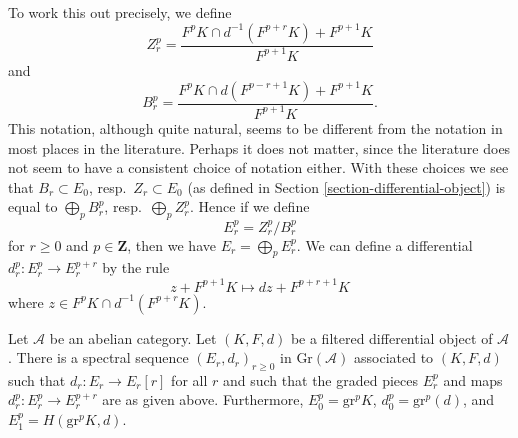 \medskip\noindent
To work this out precisely, we define
$$
Z_r^p =
\frac{F^pK \cap d^{-1}(F^{p + r}K) + F^{p + 1}K}{F^{p + 1}K}
$$
and
$$
B_r^p =
\frac{F^pK \cap d(F^{p - r + 1}K) + F^{p + 1}K}{F^{p + 1}K}.
$$
This notation, although quite natural, seems to be different from the
notation in most places in the literature. Perhaps it does not matter,
since the literature does not seem to have a consistent choice of notation
either. With these choices we see that $B_r \subset E_0$,
resp.\ $Z_r \subset E_0$ (as defined in
Section \ref{section-differential-object}) is equal to
$\bigoplus_p B_r^p$, resp.\ $\bigoplus_p Z_r^p$.
Hence if we define
$$
E_r^p = Z_r^p/B_r^p
$$
for $r \geq 0$ and $p \in \mathbf{Z}$, then we have $E_r = \bigoplus_p E_r^p$.
We can define a differential $d_r^p : E_r^p \to E_r^{p + r}$
by the rule
$$
z + F^{p + 1}K
\longmapsto
dz + F^{p + r + 1}K
$$
where $z \in F^pK \cap d^{-1}(F^{p + r}K)$.

\begin{lemma}
\label{lemma-spectral-sequence-filtered-differential}
Let $\mathcal{A}$ be an abelian category. Let $(K, F, d)$ be a
filtered differential object of $\mathcal{A}$. There is a
spectral sequence $(E_r, d_r)_{r \geq 0}$ in $\text{Gr}(\mathcal{A})$
associated to $(K, F, d)$ such that $d_r : E_r \to E_r[r]$
for all $r$ and such that the graded pieces
$E_r^p$ and maps $d_r^p : E_r^p \to E_r^{p + r}$
are as given above. Furthermore, $E_0^p = \text{gr}^p K$,
$d_0^p = \text{gr}^p(d)$, and $E_1^p = H(\text{gr}^pK, d)$.
\end{lemma}

